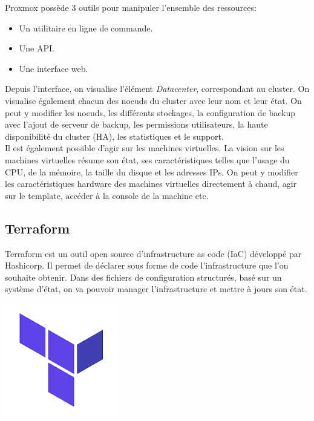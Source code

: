 \documentclass[12pt]{article}
\begin{document}
\begin{minipage}{.53\textwidth}%
\gls{Proxmox} possède 3 outils pour manipuler l'ensemble des ressources:
 \begin{itemize}
     \item Un utilitaire en ligne de commande.
     \item Une \gls{API}.
     \item Une interface web.
 \end{itemize}

Depuis l'interface, on visualise l'élément \textit{Datacenter}, correspondant au \gls{cluster}. 
On visualise également chacun des noeuds du \gls{cluster} avec leur nom et leur état. 
On peut y modifier les noeuds, les différents stockages, la configuration de backup avec l'ajout de serveur de backup, les permissions utilisateurs, la haute disponibilité du cluster (HA), les statistiques et le support. \\

Il est également possible d'agir sur les machines virtuelles. 
La vision sur les machines virtuelles résume son état, ses caractéristiques telles que l'usage du CPU, de la mémoire, la taille du disque et les adresses IPs. 
On peut y modifier les caractéristiques hardware des machines virtuelles directement à chaud, agir sur le template, accéder à la console de la machine etc. \\
\end{minipage}%

\newpage
\subsection{Terraform}
\noindent%
\begin{minipage}{.7\textwidth}%
Terraform est un outil open source d'infrastructure as code (\gls{IaC}) développé par Hashicorp. 
Il permet de déclarer sous forme de code l'infrastructure que l'on souhaite obtenir. 
Dans des fichiers de configuration structurés, basé sur un système d'état, on va pouvoir manager l'infrastructure et mettre à jours son état. \\

\end{minipage}%
\hfill
\begin{minipage}{.3\textwidth}%
\begin{center}
\includegraphics[scale=0.5]{src/logo_terraform.png}
\end{center}
\end{minipage}%
\end{document}
